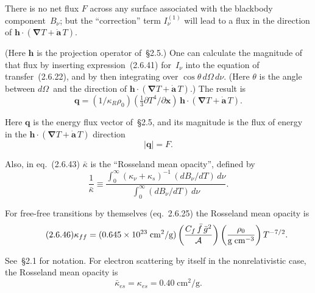 There is no net flux $F$ across any surface associated with the blackbody
component~$B_\nu$; but the ``correction'' term $I_\nu^{(1)}$ will lead to a
flux in the direction of
$\mathbf{h}\cdot(\boldsymbol{\nabla}T+\dot{\mathbf{a}}\,T)$.

(Here $\mathbf{h}$ is the projection operator of~\S2.5.)  One can calculate
the magnitude of that flux by inserting expression~(2.6.41) for~$I_\nu$ into
the equation of transfer~(2.6.22), and by then integrating over
$\cos\theta\,d\Omega\,d\nu$.  (Here $\theta$ is the angle between
$d\Omega$~and the direction of
$\mathbf{h}\cdot(\boldsymbol{\nabla}T+\dot{\mathbf{a}}\,T)$.)
The result is
%
\begin{equation}
\tag{2.6.43}
\mathbf{q} = (1/\kappa_R\rho_0)(\tfrac{1}{3}\partial T^4/\partial \mathbf{x})
  \,\mathbf{h}\cdot(\boldsymbol{\nabla}T + \dot{\mathbf{a}}\,T).
\end{equation}

Here $\mathbf{q}$ is the energy flux vector of~\S2.5, and its magnitude is the
flux of energy in the
$\mathbf{h}\cdot(\boldsymbol{\nabla}T+\dot{\mathbf{a}}\,T)$ direction
%
\begin{equation}
\tag{2.6.44}
|\mathbf{q}| = F.
\end{equation}

Also, in eq.~(2.6.43) $\bar{\kappa}$ is the ``Rosseland mean opacity'',
defined by
%
\begin{equation}
\tag{2.6.45}
\frac{1}{\bar{\kappa}}
\equiv \frac{\displaystyle\int_0^\infty
  (\kappa_\nu + \kappa_s)^{-1}\,
  (dB_\nu/dT)\,d\nu}
  {\displaystyle\int_0^\infty (dB_\nu/dT)\,d\nu}.
\end{equation}

For free-free transitions by themselves (eq.~2.6.25) the Rosseland mean
opacity is
%
\begin{equation}
\tag{2.6.46}
\kappa_{ff} = (0.645\times 10^{23}\;\text{cm}^2/\text{g})
  \left(\frac{C_f\,\bar{f}\,\bar{g}^2}{\mathcal{A}}\right)
  \left(\frac{\rho_0}{\text{g\;cm}^{-3}}\right) T^{-7/2}.
\end{equation}

See~\S2.1 for notation.  For electron scattering by itself in the nonrelativistic
case, the Rosseland mean opacity is
%
\begin{equation}
\tag{2.6.47}
\bar{\kappa}_{es} = \kappa_{es} = 0.40\;\text{cm}^2/\text{g}.
\end{equation}




